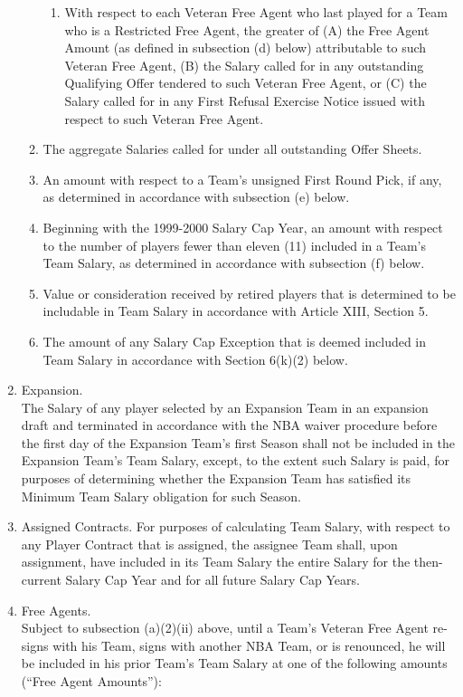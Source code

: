 \documentclass[
]{book}
\begin{document}
\begin{enumerate}
\begin{enumerate}
\begin{enumerate}
    \item
      With respect to each Veteran Free Agent who last played for a Team who is a Restricted Free Agent, the greater of (A) the Free Agent Amount (as defined in subsection (d) below) attributable to such Veteran Free Agent, (B) the Salary called for in any outstanding Qualifying Offer tendered to such Veteran Free Agent, or (C) the Salary called for in any First Refusal Exercise Notice issued with respect to such Veteran Free Agent.
    \end{enumerate}
  \item
    The aggregate Salaries called for under all outstanding Offer Sheets.
  \item
    An amount with respect to a Team's unsigned First Round Pick, if any, as determined in accordance with subsection (e) below.
  \item
    Beginning with the 1999-2000 Salary Cap Year, an amount with respect to the number of players fewer than eleven (11) included in a Team's Team Salary, as determined in accordance with subsection (f) below.
  \item
    Value or consideration received by retired players that is determined to be includable in Team Salary in accordance with Article XIII, Section 5.
  \item
    The amount of any Salary Cap Exception that is deemed included in Team Salary in accordance with Section 6(k)(2) below.
  \end{enumerate}
\item
  Expansion.\\
  The Salary of any player selected by an Expansion Team in an expansion draft and terminated in accordance with the NBA waiver procedure before the first day of the Expansion Team's first Season shall not be included in the Expansion Team's Team Salary, except, to the extent such Salary is paid, for purposes of determining whether the Expansion Team has satisfied its Minimum Team Salary obligation for such Season.
\item
  Assigned Contracts.
  For purposes of calculating Team Salary, with respect to any Player Contract that is assigned, the assignee Team shall, upon assignment, have included in its Team Salary the entire Salary for the then-current Salary Cap Year and for all future Salary Cap Years.
\item
  Free Agents.\\
  Subject to subsection (a)(2)(ii) above, until a Team's Veteran Free Agent re-signs with his Team, signs with another NBA Team, or is renounced, he will be included in his prior Team's Team Salary at one of the following amounts (``Free Agent Amounts''):


\end{enumerate}
\end{document}
